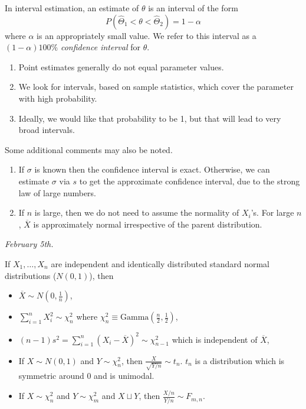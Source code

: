 \documentclass[15pt,a4paper]{book}
\theoremstyle{definition}
\newcommand{\eax}[1]{\emph{#1}\index{#1}} %
\begin{document}
In interval estimation, an estimate of $\theta$ is an interval of the form
\begin{equation}
    P(\hat{\Theta}_{1} < \theta < \hat{\Theta}_{2}) = 1-\alpha
\end{equation}
where $\alpha$ is an appropriately small value. We refer to this interval as a $(1-\alpha)100\%$ \eax{confidence interval} for $\theta$.

\begin{enumerate}
    \item Point estimates generally do not equal parameter values.
    \item We look for intervals, based on sample statistics, which cover the parameter with high probability.
    \item Ideally, we would like that probability to be 1, but that will lead to very broad intervals.
\end{enumerate}
Some additional comments may also be noted.
\begin{enumerate}
    \item If $\sigma$ is known then the confidence interval is exact. Otherwise, we can estimate $\sigma$ via $s$ to get the approximate confidence interval, due to the strong law of large numbers.
    \item If $n$ is large, then we do not need to assume the normality of $X_{i}$'s. For large $n$, $\overline{X}$ is approximately normal irrespective of the parent distribution.
\end{enumerate}

\textit{February 5th.}

If $X_{1},\ldots,X_{n}$ are independent and identically distributed standard normal distributions ($N(0,1)$), then
\begin{itemize}
    \item $\overline{X} \sim N(0, \frac{1}{n})$,
    \item $\sum_{i=1}^{n} X_{i}^{2} \sim \chi_{n}^{2}$ where $\chi_{n}^{2} \equiv \text{Gamma}(\frac{n}{2},\frac{1}{2})$,
    \item $(n-1)s^{2} = \sum_{i=1}^{n} (X_{i}-\overline{X})^{2} \sim \chi_{n-1}^{2}$ which is independent of $\overline{X}$,
    \item If $X \sim N(0,1)$ and $Y \sim \chi_{n}^{2}$, then $\frac{X}{\sqrt{Y/n}} \sim t_{n}$. $t_{n}$ is a distribution which is symmetric around 0 and is unimodal.
    \item If $X \sim \chi_{n}^{2}$ and $Y \sim \chi_{m}^{2}$ and $X \sqcup Y$, then $\frac{X/n}{Y/n} \sim F_{m,n}$.
\end{itemize}
\end{document}

